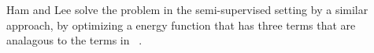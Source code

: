 \documentclass[12pt]{article} %
\begin{document}
Ham and Lee \cite{Ham2005a} solve the problem in the semi-supervised setting by a similar approach, by optimizing a energy function that has three terms that are analagous to the terms in ~\cite{Zhai2010}.

\end{document}
